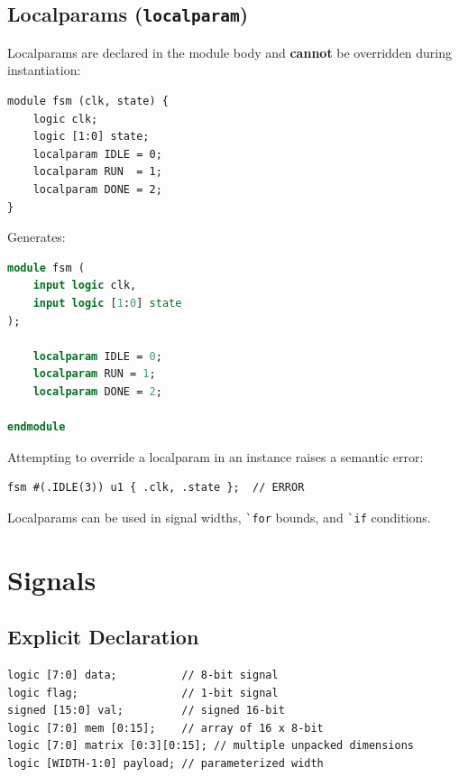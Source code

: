 \documentclass[lang=en,11pt]{elegantbook}
\newcommand{\code}[1]{\texttt{#1}}
\newcommand{\slipinline}[1]{\lstinline[language=Slip]|#1|}
\begin{document}
\section{Localparams (\code{localparam})}

Localparams are declared in the module body and \textbf{cannot} be overridden during instantiation:

\begin{lstlisting}[language=Slip]
module fsm (clk, state) {
    logic clk;
    logic [1:0] state;
    localparam IDLE = 0;
    localparam RUN  = 1;
    localparam DONE = 2;
}
\end{lstlisting}

Generates:

\begin{lstlisting}[language=SystemVerilog]
module fsm (
    input logic clk,
    input logic [1:0] state
);

    localparam IDLE = 0;
    localparam RUN = 1;
    localparam DONE = 2;

endmodule
\end{lstlisting}

Attempting to override a localparam in an instance raises a semantic error:

\begin{lstlisting}[language=Slip]
fsm #(.IDLE(3)) u1 { .clk, .state };  // ERROR
\end{lstlisting}

Localparams can be used in signal widths, \slipinline{`for} bounds, and \slipinline{`if} conditions.

\chapter{Signals}

\section{Explicit Declaration}

\begin{lstlisting}[language=Slip]
logic [7:0] data;          // 8-bit signal
logic flag;                // 1-bit signal
signed [15:0] val;         // signed 16-bit
logic [7:0] mem [0:15];    // array of 16 x 8-bit
logic [7:0] matrix [0:3][0:15]; // multiple unpacked dimensions
logic [WIDTH-1:0] payload; // parameterized width
\end{lstlisting}
\end{document}
